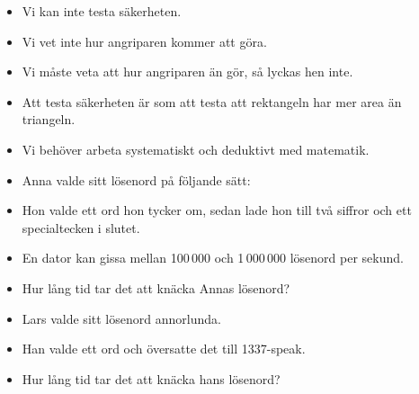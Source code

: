 \begin{frame}
  \begin{remark}
    \begin{itemize}
      \item Vi kan inte testa säkerheten.
      \item Vi vet inte hur angriparen kommer att göra.
      \item Vi måste veta att hur angriparen än gör, så lyckas hen inte.
    \end{itemize}
  \end{remark}

  \pause

  \begin{example}
    \begin{itemize}
      \item Att testa säkerheten är som att testa att rektangeln har mer area 
        än triangeln.
    \end{itemize}
  \end{example}
\end{frame}

\begin{frame}
  \begin{solution}
    \begin{itemize}
      \item Vi behöver arbeta systematiskt och deduktivt med matematik.
    \end{itemize}
  \end{solution}
\end{frame}

\begin{frame}
  \begin{exercise}
    \begin{itemize}
      \item Anna valde sitt lösenord på följande sätt:
      \item Hon valde ett ord hon tycker om, sedan lade hon till två siffror 
        och ett specialtecken i slutet.
      \item En dator kan gissa mellan 100\,000 och 1\,000\,000 lösenord per 
        sekund.
      \item Hur lång tid tar det att knäcka Annas lösenord?
    \end{itemize}
  \end{exercise}

  \pause

  \begin{exercise}
    \begin{itemize}
      \item Lars valde sitt lösenord annorlunda.
      \item Han valde ett ord och översatte det till 1337-speak.
      \item Hur lång tid tar det att knäcka hans lösenord?
    \end{itemize}
  \end{exercise}
\end{frame}

